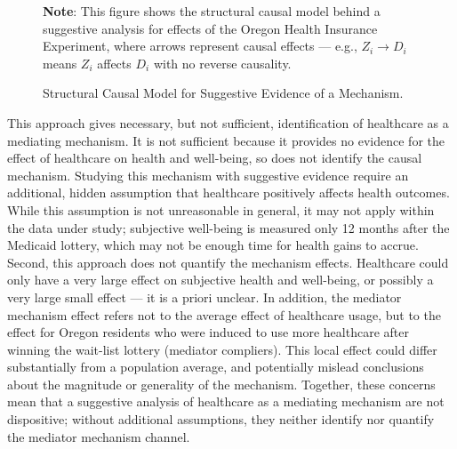 \begin{figure}[!htbp]
    \centering
    \singlespacing
    \caption{Structural Causal Model for Suggestive Evidence of a Mechanism.}
    \label{fig:scm-health}
    \justify
    \footnotesize
    \textbf{Note}:
    This figure shows the structural causal model behind a suggestive analysis for effects of the Oregon Health Insurance Experiment, where arrows represent causal effects --- e.g., $Z_i \to D_i$ means $Z_i$ affects $D_i$ with no reverse causality.
\end{figure}

This approach gives necessary, but not sufficient, identification of healthcare as a mediating mechanism.
It is not sufficient because it provides no evidence for the effect of healthcare on health and well-being, so does not identify the causal mechanism.
Studying this mechanism with suggestive evidence require an additional, hidden assumption that healthcare positively affects health outcomes.
While this assumption is not unreasonable in general, it may not apply within the data under study; subjective well-being is measured only 12 months after the Medicaid lottery, which may not be enough time for health gains to accrue.
Second, this approach does not quantify the mechanism effects.
Healthcare could only have a very large effect on subjective health and well-being, or possibly a very large small effect --- it is a priori unclear.
In addition, the mediator mechanism effect refers not to the average effect of healthcare usage, but to the effect for Oregon residents who were induced to use more healthcare after winning the wait-list lottery (mediator compliers).
This local effect could differ substantially from a population average, and potentially mislead conclusions about the magnitude or generality of the mechanism.
Together, these concerns mean that a suggestive analysis of healthcare as a mediating mechanism are not dispositive; without additional assumptions, they neither identify nor quantify the mediator mechanism channel.

